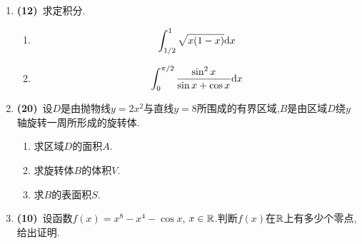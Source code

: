 \documentclass{ctexart}
\begin{document}
\begin{enumerate}[leftmargin=*,label=\textbf{\arabic*.},topsep=0pt,parsep=0pt,itemsep=0pt,partopsep=0pt]
\begin{enumerate}[label=\tbf{(\alph*)},leftmargin=*,topsep=0pt,parsep=0pt,itemsep=0pt,partopsep=0pt]
\item \[\int x\ln\sqrt{1+x^2}\di x\]
\item \[\int\dfrac{x^2+2x+3}{(x+2)^2(x+3)^2}\di x\]
\item \[\int x^2\sqrt{1-x^2}\di x\]
\end{enumerate}
    \item \textbf{(12)}\ 求定积分.
\begin{enumerate}[label=\tbf{(\alph*)},leftmargin=*,topsep=0pt,parsep=0pt,itemsep=0pt,partopsep=0pt]
\item \[\int_{1/2}^1\sqrt{x(1-x)}\mathrm{d} x\]
\item \[\int_0^{\pi/2}\dfrac{\sin^2x}{\sin x+\cos x}\mathrm{d} x\]
\end{enumerate}
    \item \textbf{(20)}\ 设$D$是由抛物线$y=2x^2$与直线$y=8$所围成的有界区域,$B$是由区域$D$绕$y$轴旋转一周所形成的旋转体.
\begin{enumerate}[label=\tbf{(\alph*)},leftmargin=*,topsep=0pt,parsep=0pt,itemsep=0pt,partopsep=0pt]
\item 求区域$D$的面积$A$.
\item 求旋转体$B$的体积$V$.
\item 求$B$的表面积$S$.
\end{enumerate}
    \item \textbf{(10)}\ 设函数$f(x)=x^8-x^4-\cos x$, $x\in\mathbb{R}$.判断$f(x)$在$\mathbb{R}$上有多少个零点,给出证明.
\end{enumerate}
\end{document}
